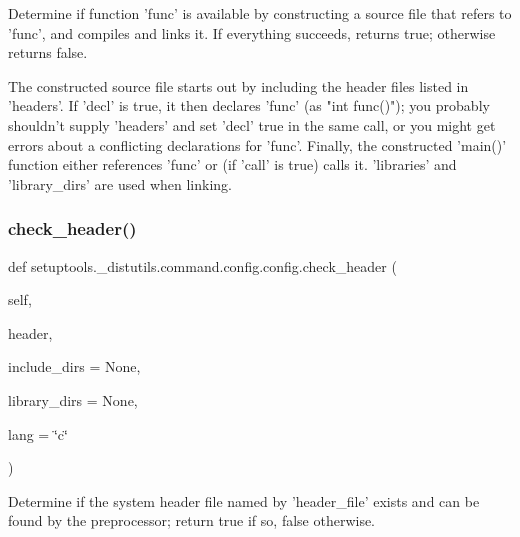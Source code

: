 \begin{DoxyVerb}Determine if function 'func' is available by constructing a
source file that refers to 'func', and compiles and links it.
If everything succeeds, returns true; otherwise returns false.

The constructed source file starts out by including the header
files listed in 'headers'.  If 'decl' is true, it then declares
'func' (as "int func()"); you probably shouldn't supply 'headers'
and set 'decl' true in the same call, or you might get errors about
a conflicting declarations for 'func'.  Finally, the constructed
'main()' function either references 'func' or (if 'call' is true)
calls it.  'libraries' and 'library_dirs' are used when
linking.
\end{DoxyVerb}
 \mbox{\label{classsetuptools_1_1__distutils_1_1command_1_1config_1_1config_a926e7aea69e0490a3fd5ccab3b432416}} 
\subsubsection{\texorpdfstring{check\+\_\+header()}{check\_header()}}
{\footnotesize\ttfamily def setuptools.\+\_\+distutils.\+command.\+config.\+config.\+check\+\_\+header (\begin{DoxyParamCaption}\item[{}]{self,  }\item[{}]{header,  }\item[{}]{include\+\_\+dirs = {\ttfamily None},  }\item[{}]{library\+\_\+dirs = {\ttfamily None},  }\item[{}]{lang = {\ttfamily \char`\"{}c\char`\"{}} }\end{DoxyParamCaption})}

\begin{DoxyVerb}Determine if the system header file named by 'header_file'
exists and can be found by the preprocessor; return true if so,
false otherwise.
\end{DoxyVerb}
 \mbox{\label{classsetuptools_1_1__distutils_1_1command_1_1config_1_1config_a04079e4c25cc45d018c03a743a2071a5}} 
